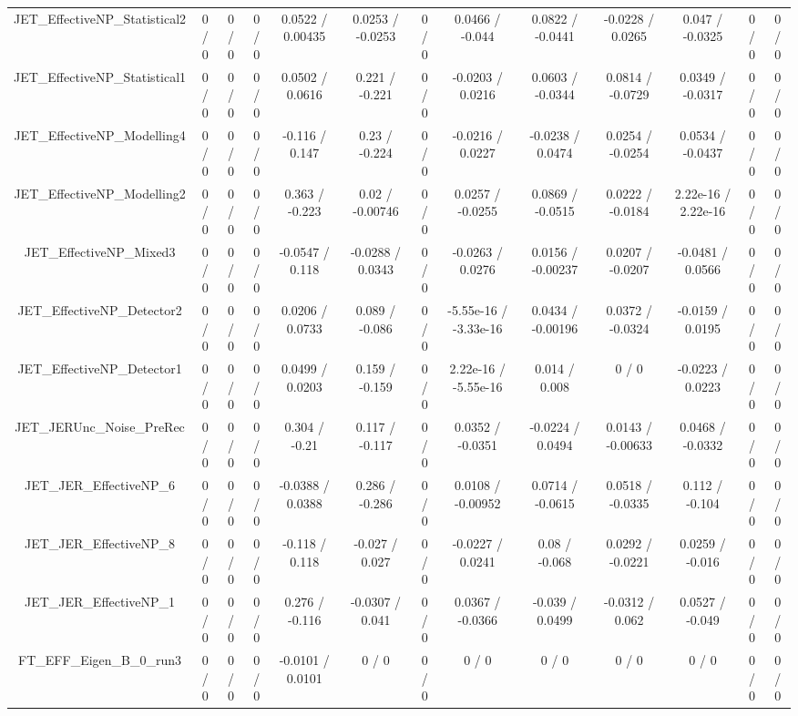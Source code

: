 \documentclass[10pt]{article}
\begin{document}
\begin{table}[htbp]
\begin{center}
\begin{tabular}{|c|c|c|c|c|c|c|c|c|c|c|c|c|}
  JET_EffectiveNP_Statistical2 & 0 / 0 & 0 / 0 & 0 / 0 & 0.0522 / 0.00435 & 0.0253 / -0.0253 & 0 / 0 & 0.0466 / -0.044 & 0.0822 / -0.0441 & -0.0228 / 0.0265 & 0.047 / -0.0325 & 0 / 0 & 0 / 0 \\ 
  JET_EffectiveNP_Statistical1 & 0 / 0 & 0 / 0 & 0 / 0 & 0.0502 / 0.0616 & 0.221 / -0.221 & 0 / 0 & -0.0203 / 0.0216 & 0.0603 / -0.0344 & 0.0814 / -0.0729 & 0.0349 / -0.0317 & 0 / 0 & 0 / 0 \\ 
  JET_EffectiveNP_Modelling4 & 0 / 0 & 0 / 0 & 0 / 0 & -0.116 / 0.147 & 0.23 / -0.224 & 0 / 0 & -0.0216 / 0.0227 & -0.0238 / 0.0474 & 0.0254 / -0.0254 & 0.0534 / -0.0437 & 0 / 0 & 0 / 0 \\ 
  JET_EffectiveNP_Modelling2 & 0 / 0 & 0 / 0 & 0 / 0 & 0.363 / -0.223 & 0.02 / -0.00746 & 0 / 0 & 0.0257 / -0.0255 & 0.0869 / -0.0515 & 0.0222 / -0.0184 & 2.22e-16 / 2.22e-16 & 0 / 0 & 0 / 0 \\ 
  JET_EffectiveNP_Mixed3 & 0 / 0 & 0 / 0 & 0 / 0 & -0.0547 / 0.118 & -0.0288 / 0.0343 & 0 / 0 & -0.0263 / 0.0276 & 0.0156 / -0.00237 & 0.0207 / -0.0207 & -0.0481 / 0.0566 & 0 / 0 & 0 / 0 \\ 
  JET_EffectiveNP_Detector2 & 0 / 0 & 0 / 0 & 0 / 0 & 0.0206 / 0.0733 & 0.089 / -0.086 & 0 / 0 & -5.55e-16 / -3.33e-16 & 0.0434 / -0.00196 & 0.0372 / -0.0324 & -0.0159 / 0.0195 & 0 / 0 & 0 / 0 \\ 
  JET_EffectiveNP_Detector1 & 0 / 0 & 0 / 0 & 0 / 0 & 0.0499 / 0.0203 & 0.159 / -0.159 & 0 / 0 & 2.22e-16 / -5.55e-16 & 0.014 / 0.008 & 0 / 0 & -0.0223 / 0.0223 & 0 / 0 & 0 / 0 \\ 
  JET_JERUnc_Noise_PreRec & 0 / 0 & 0 / 0 & 0 / 0 & 0.304 / -0.21 & 0.117 / -0.117 & 0 / 0 & 0.0352 / -0.0351 & -0.0224 / 0.0494 & 0.0143 / -0.00633 & 0.0468 / -0.0332 & 0 / 0 & 0 / 0 \\ 
  JET_JER_EffectiveNP_6 & 0 / 0 & 0 / 0 & 0 / 0 & -0.0388 / 0.0388 & 0.286 / -0.286 & 0 / 0 & 0.0108 / -0.00952 & 0.0714 / -0.0615 & 0.0518 / -0.0335 & 0.112 / -0.104 & 0 / 0 & 0 / 0 \\ 
  JET_JER_EffectiveNP_8 & 0 / 0 & 0 / 0 & 0 / 0 & -0.118 / 0.118 & -0.027 / 0.027 & 0 / 0 & -0.0227 / 0.0241 & 0.08 / -0.068 & 0.0292 / -0.0221 & 0.0259 / -0.016 & 0 / 0 & 0 / 0 \\ 
  JET_JER_EffectiveNP_1 & 0 / 0 & 0 / 0 & 0 / 0 & 0.276 / -0.116 & -0.0307 / 0.041 & 0 / 0 & 0.0367 / -0.0366 & -0.039 / 0.0499 & -0.0312 / 0.062 & 0.0527 / -0.049 & 0 / 0 & 0 / 0 \\ 
  FT_EFF_Eigen_B_0_run3 & 0 / 0 & 0 / 0 & 0 / 0 & -0.0101 / 0.0101 & 0 / 0 & 0 / 0 & 0 / 0 & 0 / 0 & 0 / 0 & 0 / 0 & 0 / 0 & 0 / 0 \\ 

\end{tabular}
\end{center}
\end{table}
\end{document}
